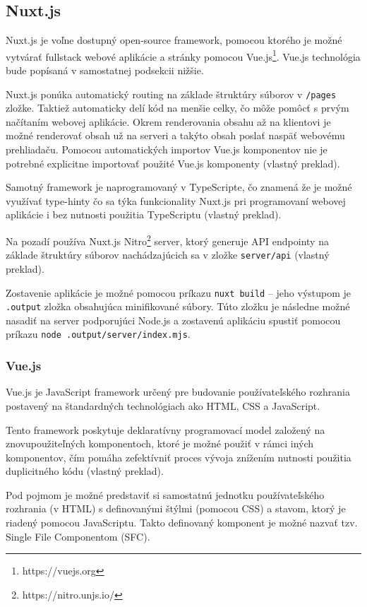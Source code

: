 \subsection {Nuxt.js}
Nuxt.js je voľne dostupný open-source framework, pomocou ktorého je možné vytvárať fullstack webové aplikácie a stránky pomocou Vue.js\footnote{https://vuejs.org}. Vue.js technológia bude popísaná v samostatnej podsekcii nižšie.

Nuxt.js ponúka automatický routing na základe štruktúry súborov v \texttt{/pages} zložke. Taktiež automaticky delí kód na menšie celky, čo môže pomôcť s prvým načítaním webovej aplikácie. Okrem renderovania obsahu až na klientovi je možné renderovať obsah už na serveri a takýto obsah poslať naspäť webovému prehliadaču. Pomocou automatických importov Vue.js komponentov nie je potrebné explicitne importovať použité Vue.js komponenty \cite{nuxt_introduction} (vlastný preklad).

Samotný framework je naprogramovaný v TypeScripte, čo znamená že je možné využívať type-hinty čo sa týka funkcionality Nuxt.js pri programovaní webovej aplikácie i bez nutnosti použitia TypeScriptu \cite{nuxt_introduction} (vlastný preklad).

Na pozadí používa Nuxt.js Nitro\footnote{https://nitro.unjs.io/} server, ktorý generuje API endpointy na základe štruktúry súborov nachádzajúcich sa v zložke \texttt{server/api} \cite{nuxt_introduction} (vlastný preklad).

Zostavenie aplikácie je možné pomocou príkazu \texttt{nuxt build} -- jeho výstupom je \texttt{.output} zložka obsahujúca minifikované súbory. Túto zložku je následne možné nasadiť na server podporujúci Node.js a zostavenú aplikáciu spustiť pomocou príkazu \texttt{node .output/server/index.mjs}.

\subsubsection {Vue.js}
Vue.js je JavaScript framework určený pre budovanie používateľského rozhrania postavený na štandardných technológiach ako HTML, CSS a JavaScript.

\clearpage

Tento framework poskytuje deklaratívny programovací model založený na znovupoužiteľných komponentoch, ktoré je možné použiť v rámci iných komponentov, čím pomáha zefektívniť proces vývoja znížením nutnosti použitia duplicitného kódu \cite{vuejs_introduction} (vlastný preklad).

Pod pojmom  je možné predstaviť si samostatnú jednotku používateľského rozhrania (v HTML) s definovanými štýlmi (pomocou CSS) a stavom, ktorý je riadený pomocou JavaScriptu.
Takto definovaný komponent je možné nazvať tzv. Single File Componentom (SFC).

